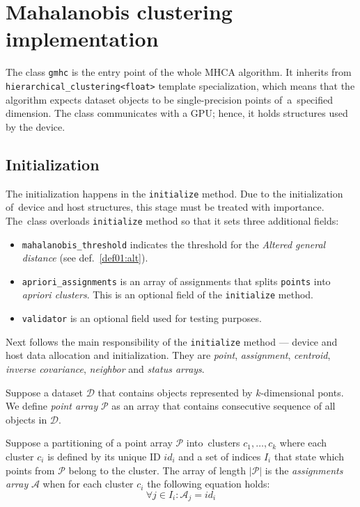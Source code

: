 \section{Mahalanobis clustering implementation}

The class \texttt{gmhc} is the entry point of the whole MHCA algorithm. It inherits from \texttt{hierarchical\_clustering<float>} template specialization, which means that the algorithm expects dataset objects to be single-precision points of~a~specified dimension. The class communicates
with a GPU; hence, it holds structures used by the device.

\subsection{Initialization}

The initialization happens in the \texttt{initialize} method. Due to the initialization of~device and host structures, this stage must be treated with importance.
The~class overloads \texttt{initialize} method so that it sets three additional fields:
\begin{itemize}
	\item \texttt{mahalanobis\_threshold} indicates the threshold for the \emph{Altered general distance} (see def.~\ref{def01:alt}).
	
	\item\texttt{apriori\_assignments}  is an array of assignments that splits \texttt{points} into \emph{apriori clusters}. This is an optional field of the \texttt{initialize} method.
	
	\item \texttt{validator} is an optional field used for testing purposes.
\end{itemize}

Next follows the main responsibility of the \texttt{initialize} method --- device and host data allocation and initialization. They are \emph{point}, \emph{assignment}, \emph{centroid}, \emph{inverse covariance}, \emph{neighbor} and \emph{status arrays}.

\begin{defn}
	Suppose a dataset $\mathcal{D}$ that contains objects represented by $k$-di\-men\-si\-onal ponts. We define \emph{point array} $\mathcal{P}$ as an array that contains consecutive sequence of all objects in $\mathcal{D}$.
	\label{def03:point}
\end{defn}

\begin{defn}
	Suppose a partitioning of a point array $\mathcal{P}$ into~clusters $c_1,\dots,c_k$ where each cluster $c_i$ is defined by its unique ID $id_i$ and a set of indices $I_i$ that state which points from $\mathcal{P}$ belong to the cluster. The array of length $|\mathcal{P}|$ is the \emph{assignments array} $\mathcal{A}$ when for each cluster $c_i$ the following equation holds:
	$${\forall j \in I_i : \mathcal{A}_j = id_i}$$
	\label{def03:assign}
\end{defn}

